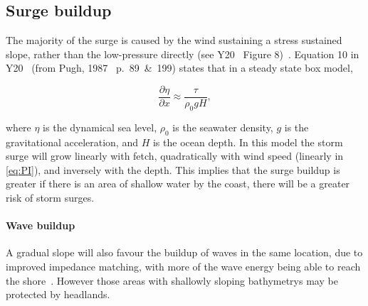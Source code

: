 \subsection{Surge buildup}

The majority of the surge is caused by the wind
sustaining a stress sustained slope,
rather than the low-pressure directly
(see Y20~\cite{ZannaPreprint} Figure 8)~\cite{emanuel2005divine}.
Equation 10 in Y20~\cite{ZannaPreprint}
(from Pugh, 1987~\cite{pugh1987tides} p.~89~\&~199) states that in a steady state box model,

\begin{equation}
\frac{\partial \eta}{\partial x}
\approx \frac{\tau}{\rho_{0} g H},
\label{eq:pugh}
\end{equation}

where $\eta$ is the dynamical sea level, $\rho_0$ is the seawater density,
$g$ is the gravitational acceleration, and $H$ is the ocean depth.
In this model
the storm surge
will grow linearly with fetch,
quadratically with wind speed (linearly in \ref{eq:PI}),
and inversely with the depth.
This implies that the surge buildup is greater if there is an area of
shallow water by the coast, there will
be a greater risk of storm surges.


\paragraph{Wave buildup}

A gradual slope will also favour the buildup of waves in the same location, due to
improved impedance matching, with more of the wave energy being able to
reach the shore~\cite{pugh1987tides}. However those areas with shallowly sloping
bathymetrys may be protected by headlands.
